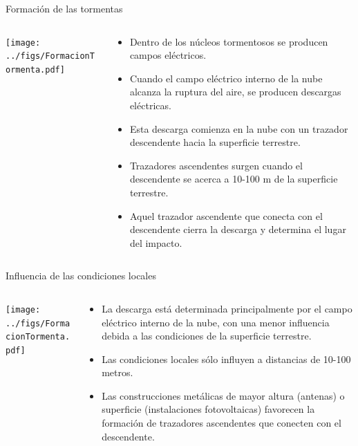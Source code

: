 \documentclass[aspectratio=169, usenames,svgnames,dvipsnames]{beamer}
\begin{document}
\begin{frame}[label={sec:org7becc91}]{Formación de las tormentas}
\begin{columns}
\begin{column}{0.5\columnwidth}
\begin{center}
\texttt{[image: ../figs/FormacionTormenta.pdf]}
\end{center}
\end{column}

\begin{column}{0.5\columnwidth}
\begin{itemize}
\item Dentro de los núcleos tormentosos se producen campos eléctricos.

\item Cuando el campo eléctrico interno de la nube alcanza la ruptura del
aire, se producen descargas eléctricas.

\item \alert{Esta descarga comienza en la nube} con un \alert{trazador descendente} hacia
la superficie terrestre.

\item Trazadores ascendentes surgen cuando el descendente se acerca a
10-100 m de la superficie terrestre.

\item Aquel trazador ascendente que conecta con el descendente cierra la
descarga y determina el lugar del impacto.
\end{itemize}
\end{column}
\end{columns}
\end{frame}

\begin{frame}[label={sec:org88671a7}]{Influencia de las condiciones locales}
\begin{columns}
\begin{column}{0.5\columnwidth}
\begin{center}
\texttt{[image: ../figs/FormacionTormenta.pdf]}
\end{center}
\end{column}

\begin{column}{0.5\columnwidth}
\begin{itemize}
\item \alert{La descarga está determinada principalmente por el campo eléctrico
interno de la nube}, con una menor influencia debida a las
condiciones de la superficie terrestre.

\item Las \alert{condiciones locales sólo influyen} a distancias de 10-100 metros.

\item Las \alert{construcciones metálicas de mayor altura} (antenas) o superficie
(instalaciones fotovoltaicas) favorecen la formación de trazadores
ascendentes que conecten con el descendente.
\end{itemize}
\end{column}
\end{columns}
\end{frame}
\end{document}
